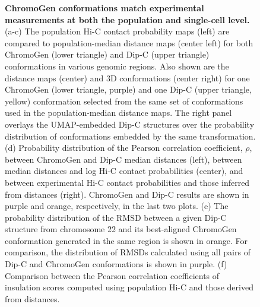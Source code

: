 \documentclass[12pt,letterpaper]{article}
\begin{document}
\begin{figure}[H]
    \centering
    \caption{
    \textbf{ChromoGen conformations match experimental measurements at both the population and single-cell level.
    }
    (a-c)
    The population Hi-C contact probability maps (left) are compared to population-median distance maps (center left) for both ChromoGen (lower triangle) and Dip-C (upper triangle) conformations in various genomic regions. 
    Also shown are the distance maps (center) and 3D conformations (center right) for one ChromoGen (lower triangle, purple) and one Dip-C (upper triangle, yellow) conformation selected from the same set of conformations used in the population-median distance maps. The right panel overlays the UMAP-embedded Dip-C structures over the probability distribution of conformations embedded by the same transformation. 
    (d) 
    Probability distribution of the Pearson correlation coefficient, $\rho$, between ChromoGen and Dip-C median distances (left), between median distances and log Hi-C contact probabilities (center), and between experimental Hi-C contact probabilities and those inferred from distances (right). ChromoGen and Dip-C results are shown in purple and orange, respectively, in the last two plots. 
    (e) The probability distribution of the RMSD between a given Dip-C structure from chromosome 22 and its best-aligned ChromoGen conformation generated in the same region is shown in orange. For comparison, the  distribution of RMSDs calculated using all pairs of Dip-C and ChromoGen conformations is shown in purple. 
    (f) Comparison between the Pearson correlation coefficients of insulation scores computed using population Hi-C and those derived from distances. 
    }
    \label{fig:guided_ensemble}
\end{figure}
\end{document}
